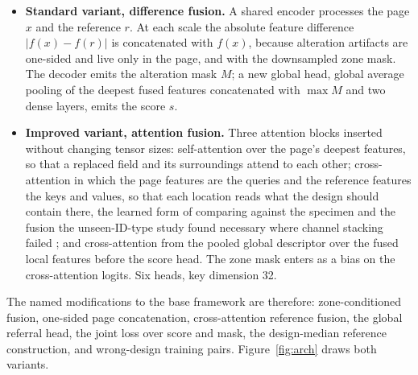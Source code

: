 \documentclass[11pt,a4paper]{article}
\begin{document}
\begin{itemize}
\item \textbf{Standard variant, difference fusion.} A shared encoder processes the page $x$ and the reference $r$. At each scale the absolute feature difference $|f(x) - f(r)|$ is concatenated with $f(x)$, because alteration artifacts are one-sided and live only in the page, and with the downsampled zone mask. The decoder emits the alteration mask $M$; a new global head, global average pooling of the deepest fused features concatenated with $\max M$ and two dense layers, emits the score $s$.
\item \textbf{Improved variant, attention fusion.} Three attention blocks inserted without changing tensor sizes: self-attention over the page's deepest features, so that a replaced field and its surroundings attend to each other; cross-attention in which the page features are the queries and the reference features the keys and values, so that each location reads what the design should contain there, the learned form of comparing against the specimen and the fusion the unseen-ID-type study found necessary where channel stacking failed \cite{neitthoffer2023knowledge}; and cross-attention from the pooled global descriptor over the fused local features before the score head. The zone mask enters as a bias on the cross-attention logits. Six heads, key dimension 32.
\end{itemize}

The named modifications to the base framework are therefore: zone-conditioned fusion, one-sided page concatenation, cross-attention reference fusion, the global referral head, the joint loss over score and mask, the design-median reference construction, and wrong-design training pairs. Figure~\ref{fig:arch} draws both variants.
\end{document}
